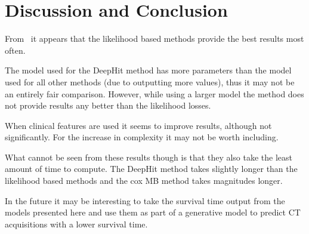 
\section{Discussion and Conclusion} \label{sec:discussion}
    From~ it appears that the likelihood based methods provide the best results most often.
    
    The model used for the DeepHit method has more parameters than the model used for all other methods (due to outputting more values), thus it may not be an entirely fair comparison. However, while using a larger model the method does not provide results any better than the likelihood losses.
    
    When clinical features are used it seems to improve results, although not significantly. For the increase in complexity it may not be worth including.
    
    What cannot be seen from these results though is that they also take the least amount of time to compute. The DeepHit method takes slightly longer than the likelihood based methods and the cox \gls{MB} method takes magnitudes longer.

    In the future it may be interesting to take the survival time output from the models presented here and use them as part of a generative model to predict \gls{CT} acquisitions with a lower survival time.

